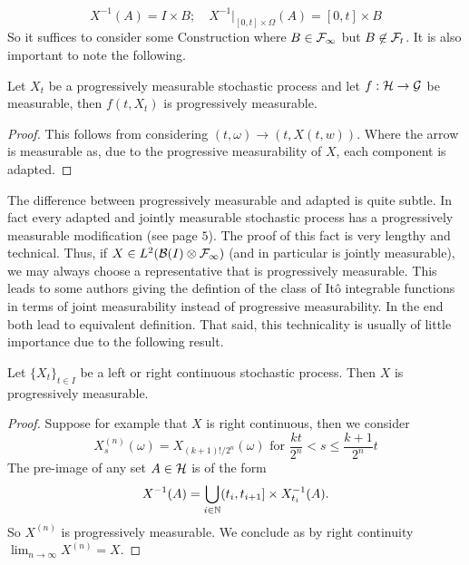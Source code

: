 \documentclass[
    a4paper,
    DIV=14,
    abstract=true,
    numbers=noenddot
]{scrartcl}
\begin{document}
\begin{equation*}
	X^{-1}(A)=I\times B;\quad {X^{-1}}|_{[0,t]\times\Omega}(A)= [0,t]\times B
\end{equation*}
So it suffices to consider some Construction where $B\in\mathcal{F}_\infty$ but $B\not\in\mathcal{F}_t$.
It is also important to note the following.
\begin{lemma}
	Let $X_t$ be a  progressively measurable stochastic process and let $f:\mathcal{H}\to\mathcal{G}$ be measurable, then $f(t,X_t)$ is progressively measurable.
\end{lemma}
\begin{proof}
	This follows from considering $(t,\omega)\to (t,X(t,w))$. Where the arrow is measurable as, due to the progressive measurability of $X$, each component is adapted.
\end{proof}
The difference between progressively measurable and adapted is quite subtle. In fact every adapted and jointly measurable stochastic process has a progressively measurable modification (see \cite{Karatzas1987BrownianMA} page $5$). The proof of this fact is very lengthy and technical. Thus, if $X\in L^2(\mathcal{B}(I)\otimes\mathcal{F}_\infty)$ (and in particular is jointly measurable), we may always choose a representative that is progressively measurable. This leads to some authors giving the defintion of the class of Itô integrable functions in terms of joint measurability instead of progressive measurability. In the end both lead to equivalent definition. That said, this technicality is usually of little importance due to the following result.
\begin{lemma}
	Let $\{X_t\}_{t\in I}$ be a left or right continuous stochastic process. Then $X$ is progressively measurable.
\end{lemma}
\begin{proof}
	Suppose for example that $X$ is right continuous, then we consider
	\begin{equation*}
		X_{s}^{(n)}(\omega)=X_{(k+1) ! / 2^{n}}(\omega) \text { for } \frac{k t}{2^{n}}<s \leq \frac{k+1}{2^{n}} t
	\end{equation*}
	The pre-image of any set $A\in\mathcal{H}$ is of the form
	\begin{equation*}
		X^{-1}(A)=\bigcup_{i\in \mathbb{N}}(t_i,t_{i+1}]\times X_{t_i}^{-1}(A).
	\end{equation*}
	So $X^{(n)}$ is progressively measurable.	We conclude as by right continuity $\lim_{n \to \infty}X^{(n)}=X$.
\end{proof}
\end{document}
